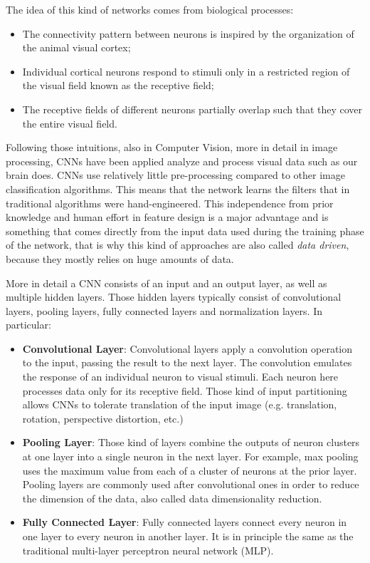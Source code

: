 The idea of this kind of networks comes from biological processes: 

\begin{itemize}
	\item The connectivity pattern between neurons is inspired by the organization of the animal visual cortex; 	
	\item Individual cortical neurons respond to stimuli only in a restricted region of the visual field known as the receptive field; 
	\item The receptive fields of different neurons partially overlap such that they cover the entire visual field.
\end{itemize}

Following those intuitions, also in Computer Vision, more in detail in image processing, CNNs have been applied analyze and process visual data such as our brain does. CNNs use relatively little pre-processing compared to other image classification algorithms. This means that the network learns the filters that in traditional algorithms were hand-engineered. This independence from prior knowledge and human effort in feature design is a major advantage and is something that comes directly from the input data used during the training phase of the network, that is why this kind of approaches are also called \emph{data driven}, because they mostly relies on huge amounts of data.

More in detail a CNN consists of an input and an output layer, as well as multiple hidden layers. Those hidden layers typically consist of convolutional layers, pooling layers, fully connected layers and normalization layers. In particular:

\begin{itemize}
	\item \textbf{Convolutional Layer}: Convolutional layers apply a convolution operation to the input, passing the result to the next layer. The convolution emulates the response of an individual neuron to visual stimuli. Each neuron here processes data only for its receptive field. Those kind of input partitioning allows CNNs to tolerate translation of the input image (e.g. translation, rotation, perspective distortion, etc.)
	\item \textbf{Pooling Layer}: Those kind of layers combine the outputs of neuron clusters at one layer into a single neuron in the next layer. For example, max pooling uses the maximum value from each of a cluster of neurons at the prior layer. Pooling layers are commonly used after convolutional ones in order to reduce the dimension of the data, also called data dimensionality reduction.
	\item \textbf{Fully Connected Layer}: Fully connected layers connect every neuron in one layer to every neuron in another layer. It is in principle the same as the traditional multi-layer perceptron neural network (MLP).
\end{itemize}

